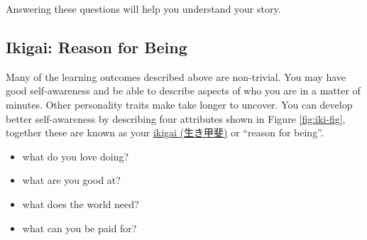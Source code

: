 \documentclass[
]{book}
\providecommand{\tightlist}{%
  \setlength{\itemsep}{0pt}\setlength{\parskip}{0pt}}
\begin{document}
Answering these questions will help you understand your story.

\hypertarget{no42}{%
\subsection{Ikigai: Reason for Being}\label{no42}}

Many of the learning outcomes described above are non-trivial. You may have good self-awareness and be able to describe aspects of who you are in a matter of minutes. Other personality traits make take longer to uncover. You can develop better self-awareness by describing four attributes shown in Figure \ref{fig:iki-fig}, together these are known as your \href{https://en.wikipedia.org/wiki/Ikigai}{ikigai (生き甲斐)} or ``reason for being''.

\begin{itemize}
\tightlist
\item
  what do you love doing?
\item
  what are you good at?
\item
  what does the world need?
\item
  what can you be paid for?
\end{itemize}
\end{document}
